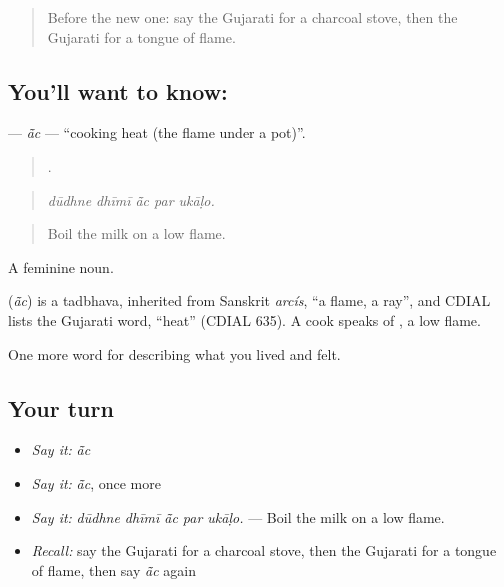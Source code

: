 \label{lesson:GU-C519-ac}



\begin{quote}
Before the new one: say the Gujarati for a charcoal stove, then the Gujarati for a tongue of flame.
\end{quote}

\subsection*{You'll want to know: }
\textbf{} — \emph{ā̃c} — \textquotedblleft{}cooking heat (the flame under a pot)\textquotedblright{}.

\begin{quote}
    .
\end{quote}

\begin{quote}
\emph{dūdhne dhīmī ā̃c par ukāḷo.}
\end{quote}

\begin{quote}
Boil the milk on a low flame.
\end{quote}

A feminine noun.

\begin{cousinweb}
\textbf{} (\emph{ā̃c}) is a tadbhava, inherited from Sanskrit \emph{arcís}, \textquotedblleft{}a flame, a ray\textquotedblright{}, and CDIAL lists the Gujarati word, \textquotedblleft{}heat\textquotedblright{} (CDIAL 635). A cook speaks of \textbf{ }, a low flame.
\end{cousinweb}

\begin{grammarlens}[title={What you've built}]
One more word for describing what you lived and felt.
\end{grammarlens}

\subsection*{Your turn}
\begin{itemize}
\raggedright
  \item \emph{Say it:} \emph{ā̃c}
  \item \emph{Say it:} \emph{ā̃c}, once more
  \item \emph{Say it:} \emph{dūdhne dhīmī ā̃c par ukāḷo.} — Boil the milk on a low flame.
  \item \emph{Recall:} say the Gujarati for a charcoal stove, then the Gujarati for a tongue of flame, then say \emph{ā̃c} again
\end{itemize}

